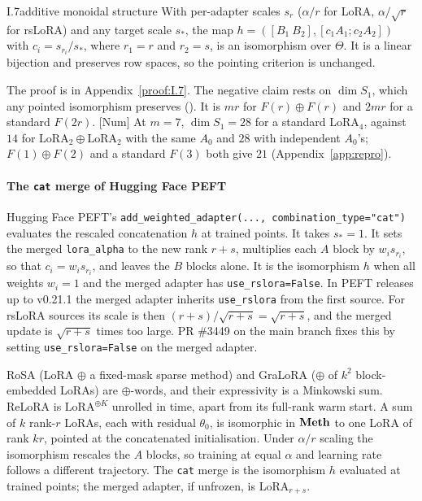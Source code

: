 \begin{observation}{I.7}{additive monoidal structure}
With per-adapter scales $s_r$ ($\alpha/r$ for LoRA, $\alpha/\sqrt r$ for rsLoRA) and any target scale $s_*$, the map
$h=([B_1\ B_2],[c_1A_1;c_2A_2])$ with $c_i=s_{r_i}/s_*$, where $r_1=r$ and $r_2=s$, is an isomorphism over $\Theta$. It is
a linear bijection and preserves row spaces, so the pointing criterion is unchanged.
\end{observation}

\noindent The proof is in Appendix~\ref{proof:I.7}. The negative claim rests on $\dim S_1$, which any pointed
isomorphism preserves (). It is $mr$ for $F(r)\oplus F(r)$ and $2mr$ for a standard $F(2r)$.
[Num] At $m=7$, $\dim S_1=28$ for a standard $\mathrm{LoRA}_4$, against $14$ for $\mathrm{LoRA}_2\oplus\mathrm{LoRA}_2$
with the same $A_0$ and $28$ with independent $A_0$'s; $F(1)\oplus F(2)$ and a standard $F(3)$ both give $21$
(Appendix~\ref{app:repro}).

\paragraph{The \texttt{cat} merge of Hugging Face PEFT}
Hugging Face PEFT's \texttt{add\_weighted\_adapter(..., combination\_type="cat")} \citep{xmangrulkar2022peft} evaluates the
rescaled concatenation $h$ at trained points. It takes $s_*=1$. It sets the merged \texttt{lora\_alpha} to the new rank
$r+s$, multiplies each $A$ block by $w_is_{r_i}$, so that $c_i=w_is_{r_i}$, and leaves the $B$ blocks alone. It is the
isomorphism $h$ when all weights $w_i=1$ and the merged adapter has \texttt{use\_rslora=False}. In PEFT releases up to
v0.21.1 the merged adapter inherits \texttt{use\_rslora} from the first source. For rsLoRA sources
\citep{kalajdzievski2023rank} its scale is then $(r+s)/\sqrt{r+s}=\sqrt{r+s}$, and the merged update is $\sqrt{r+s}$ times
too large. PR \#3449 on the main branch fixes this by setting \texttt{use\_rslora=False} on the merged adapter.

\begin{explains}
RoSA \citep{nikdan2024rosa} (LoRA $\oplus$ a fixed-mask sparse method) and GraLoRA \citep{jung2025gralora} ($\oplus$ of
$k^2$ block-embedded LoRAs) are $\oplus$-words, and their expressivity is a Minkowski sum. ReLoRA \citep{lialin2023relora}
is $\mathrm{LoRA}^{\oplus K}$ unrolled in time, apart from its full-rank warm start. A sum of $k$ rank-$r$ LoRAs, each with
residual $\theta_0$, is isomorphic in $\mathbf{Meth}$ to one LoRA of rank $kr$, pointed at the concatenated initialisation. Under
$\alpha/r$ scaling the isomorphism rescales the $A$ blocks, so training at equal $\alpha$ and learning rate follows a
different trajectory. The \texttt{cat} merge is the isomorphism $h$ evaluated at trained points; the merged adapter, if
unfrozen, is $\mathrm{LoRA}_{r+s}$.
\end{explains}


